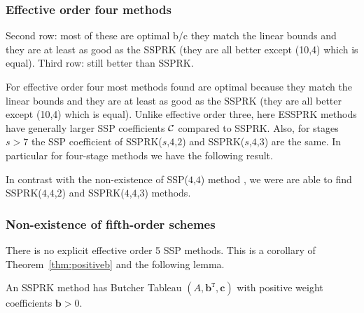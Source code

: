 \subsubsection{Effective order four methods}\label{subsubsection3.4.2}

  Second row: most of these are optimal b/c they match the linear bounds and they are at least as good as the SSPRK (they are all better except (10,4) which is equal).  Third row: still better than SSPRK.

For effective order four most methods found are optimal because they match the linear bounds and they are at least as good as the SSPRK (they are all better except (10,4) which is equal). Unlike effective order three, here ESSPRK methods have generally larger SSP coefficients $\mathcal{C}$ compared to SSPRK. Also, for stages \( s > 7 \) the SSP coefficient of SSPRK(\( s \),\( 4 \),\( 2 \)) and SSPRK(\( s \),\( 4 \),\( 3 \)) are the same. In particular for four-stage methods we have the following result.

\begin{result}
  In contrast with the non-existence of SSP(\( 4 \),\( 4 \)) method
  \cite{Gottlieb1998,Ruuth2002}, we were are able to
  find SSPRK(\( 4 \),\( 4 \),\( 2 \)) and SSPRK(\( 4 \),\( 4 \),\( 3
  \)) methods.
\end{result}








\subsubsection{Non-existence of fifth-order schemes}\label{sec:noESSP5}

There is no explicit effective order 5 SSP methods.  This is a corollary of Theorem~\ref{thm:positiveb} and the following lemma.

\begin{lemma}\label{lem:ssp_pos_coef}\cite{Ruuth2002}
  An SSPRK method
  has Butcher Tableau \( (A,\textbf{b}^{\texttt{T}},\textbf{c}) \) with positive weight coefficients \( \textbf{b} > 0 \).
\end{lemma}

